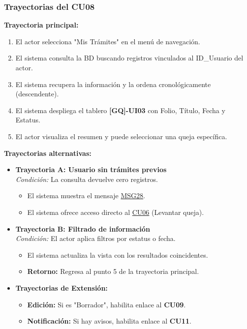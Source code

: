 \begin{appendices}
\subsubsection{Trayectorias del CU08}

\textbf{Trayectoria principal:}
\begin{enumerate}[nosep]
    \item El actor selecciona "Mis Trámites" en el menú de navegación.
    \item El sistema consulta la BD buscando registros vinculados al ID\_Usuario del actor.
    \item El sistema recupera la información y la ordena cronológicamente (descendente).
    \item El sistema despliega el tablero \textbf{[GQ]-UI03} con Folio, Título, Fecha y Estatus.
    \item El actor visualiza el resumen y puede seleccionar una queja específica.
\end{enumerate}

\textbf{Trayectorias alternativas:}
\begin{itemize}[leftmargin=*]
    \item \textbf{Trayectoria A: Usuario sin trámites previos} \\
    \textit{Condición:} La consulta devuelve cero registros.
    \begin{itemize}[nosep]
        \item[A-1:] El sistema muestra el mensaje \hyperlink{msg:MSG28}{MSG28}.
        \item[A-2:] El sistema ofrece acceso directo al \hyperlink{anexo:casos_uso}{CU06} (Levantar queja).
    \end{itemize}
    \item \textbf{Trayectoria B: Filtrado de información} \\
    \textit{Condición:} El actor aplica filtros por estatus o fecha.
    \begin{itemize}[nosep]
        \item[B-1:] El sistema actualiza la vista con los resultados coincidentes.
        \item \textbf{Retorno:} Regresa al punto 5 de la trayectoria principal.
    \end{itemize}
    \item \textbf{Trayectorias de Extensión:}
    \begin{itemize}[nosep]
        \item \textbf{Edición:} Si es "Borrador", habilita enlace al \textbf{CU09}.
        \item \textbf{Notificación:} Si hay avisos, habilita enlace al \textbf{CU11}.
    \end{itemize}
\end{itemize}



\end{appendices}
